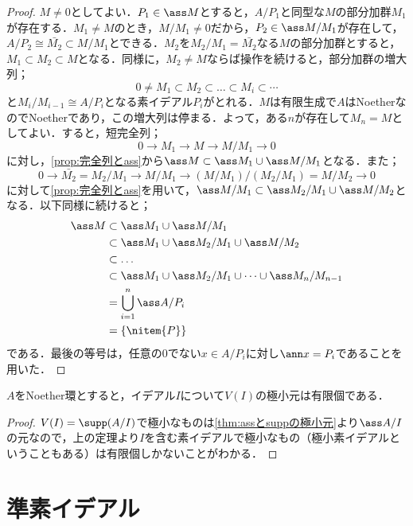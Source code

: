 \begin{proof}
	$M\neq0$としてよい．$ P_1\in\ass M$とすると，$A/ P_1$と同型な$M$の部分加群$M_1$が存在する．$M_1\neq M$のとき，$M/M_1\neq0$だから，$ P_2\in\ass M/M_1$が存在して，$A/ P_2\cong\bar{M_2}\subset M/M_1$とできる．$M_2$を$M_2/M_1=\bar{M_2}$なる$M$の部分加群とすると，$M_1\subset M_2\subset M$となる．同様に，$M_2\neq M$ならば操作を続けると，部分加群の増大列；
	\[0\neq M_1\subset M_2\subset\dots\subset M_i\subset\cdots\]
	と$M_i/M_{i-1}\cong A/ P_i$となる素イデアル$ P_i$がとれる．$M$は有限生成で$A$はNoetherなのでNoetherであり，この増大列は停まる．よって，ある$n$が存在して$M_n=M$としてよい．すると，短完全列；
	\[0\longrightarrow M_1\longrightarrow M\longrightarrow M/M_1\longrightarrow0\]
	に対し，\ref{prop:完全列とass}から$\ass M\subset \ass M_1\cup \ass M/M_1$となる．また；
	\[0\longrightarrow \bar{M_2}=M_2/M_1\longrightarrow M/M_1\longrightarrow (M/M_1)/(M_2/M_1)=M/M_2\longrightarrow0\]
	に対して\ref{prop:完全列とass}を用いて，$\ass M/M_1\subset \ass M_2/M_1\cup \ass M/M_2$となる．以下同様に続けると；
	\[\begin{aligned}
		\ass M&\subset\ass M_1\cup \ass M/M_1\\
		&\subset \ass M_1\cup \ass M_2/M_1\cup \ass M/M_2\\
		&\subset\dots\\
		&\subset\ass M_1\cup\ass M_2/M_1\cup\dots\cup\ass M_n/M_{n-1}\\
		&=\bigcup_{i=1}^n\ass A/ P_i\\
		&=\{\nitem{ P}\}
	\end{aligned}\]
	である．最後の等号は，任意の0でない$x\in A/ P_i$に対し$\ann x= P_i$であることを用いた．
\end{proof}

\begin{cor}\label{cor:Noether環の極小素イデアルは有限個}
	$A$をNoether環とすると，イデアル$I$について$V(I)$の極小元は有限個である．
\end{cor}

\begin{proof}
	$V(I)=\supp(A/I)$で極小なものは\ref{thm:assとsuppの極小元}より$\ass A/I$の元なので，上の定理より$I$を含む素イデアルで極小なもの（極小素イデアルということもある）は有限個しかないことがわかる．
\end{proof}

\section{準素イデアル}

